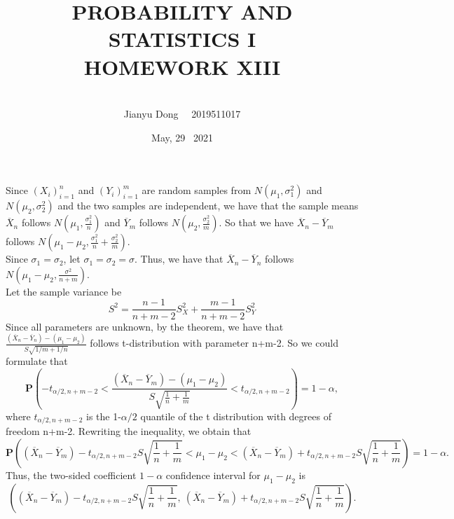 \documentclass[10.5pt]{article}
\title{PROBABILITY AND STATISTICS I
\\HOMEWORK XIII}
\author{\\Jianyu Dong   ~~2019511017}
\date{May, 29~ 2021}
\begin{document}
    
\maketitle
\newpage

\section{}
Since $(X_i)_{i=1}^n$ and $(Y_i)_{i=1}^m$ are random samples from $N(\mu_1,\sigma_1^2)$ and $N(\mu_2,\sigma_2^2)$ and the two samples are independent, we have that the sample means $\overline{X}_n$ follows $N(\mu_1,\frac{\sigma_1^2}{n})$ and $\overline{Y}_m$ follows $N(\mu_2,\frac{\sigma_2^2}{m})$. So that we have $\overline{X}_n-\overline{Y}_m$ follows $N(\mu_1-\mu_2,\frac{\sigma_1^2}{n}+\frac{\sigma_2^2}{m})$.\\\indent 
Since $\sigma_1=\sigma_2$, let $\sigma_1=\sigma_2=\sigma$. Thus, we have that $\overline{X}_n-\overline{Y}_n$ follows $N(\mu_1-\mu_2,\frac{\sigma^2}{n+m})$.\\\indent
Let the sample variance be $$S^2=\frac{n-1}{n+m-2}S_X^2+\frac{m-1}{n+m-2}S_Y^2$$\indent
Since all parameters are unknown, by the theorem, we have that $\frac{(\overline{X}_n-\overline{Y}_n)-(\mu_1-\mu_2)}{S\sqrt{1/m+1/n}}$ follows t-distribution with parameter n+m-2. So we could formulate that $$\mathbf{P}\left(-t_{\alpha/2,n+m-2}<\frac{(\overline{X}_n-\overline{Y}_m)-(\mu_1-\mu_2)}{S\sqrt{\frac{1}{n}+\frac{1}{m}}}<t_{\alpha/2,n+m-2}\right)=1-\alpha,$$\indent
where $t_{\alpha/2,n+m-2}$ is the 1-$\alpha/2$ quantile of the t distribution with degrees of freedom n+m-2. Rewriting the inequality, we obtain that $$\mathbf{P}\left((\overline{X}_n-\overline{Y}_m)-t_{\alpha/2,n+m-2}S\sqrt{\frac{1}{n}+\frac{1}{m}}<\mu_1-\mu_2<(\overline{X}_n-\overline{Y}_m)+t_{\alpha/2,n+m-2}S\sqrt{\frac{1}{n}+\frac{1}{m}}\right)=1-\alpha.$$\indent
Thus, the two-sided coefficient $1-\alpha$ confidence interval for $\mu_1-\mu_2$ is $$\left((\overline{X}_n-\overline{Y}_m)-t_{\alpha/2,n+m-2}S\sqrt{\frac{1}{n}+\frac{1}{m}},~(\overline{X}_n-\overline{Y}_m)+t_{\alpha/2,n+m-2}S\sqrt{\frac{1}{n}+\frac{1}{m}}\right).$$
\end{document}
